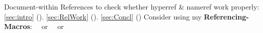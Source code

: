 











\npi%
Document-within References to check whether hyperref \& nameref work properly:\nl%
\ref{sec:intro} (). \ref{sec:RelWork}  (). \ref{sec:Concl} ()\nl%
Consider using my \textbf{Referencing-Macros}:\nl
{}\nl
\ \ or \nl
\ \ or 

